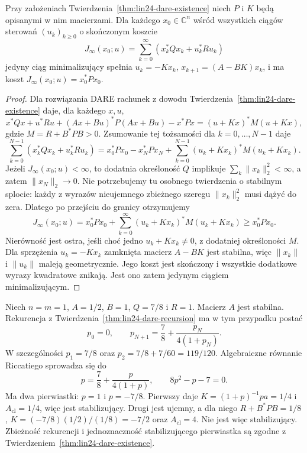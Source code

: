 \begin{wniosek}
\label{cor:lin24-discrete-opt}
Przy założeniach
Twierdzenia~\ref{thm:lin24-dare-existence}
niech \(P\) i \(K\)
będą opisanymi w nim macierzami.
Dla każdego \(x_0\in\mathbb C^n\)
wśród wszystkich ciągów sterowań
\((u_k)_{k\ge0}\)
o skończonym koszcie
\[
 J_\infty(x_0;u)
 =\sum_{k=0}^\infty
      (x_k^*Qx_k+u_k^*Ru_k)
\]
jedyny ciąg minimalizujący
spełnia \(u_k=-Kx_k\),
\(x_{k+1}=(A-BK)x_k\),
i ma koszt
\(J_\infty(x_0;u)=x_0^*Px_0\).
\end{wniosek}
\begin{proof}
Dla rozwiązania DARE
rachunek z dowodu
Twierdzenia~\ref{thm:lin24-dare-existence}
daje, dla każdego \(x,u\),
\[
 x^*Qx+u^*Ru+
 (Ax+Bu)^*P(Ax+Bu)-x^*Px
 =(u+Kx)^*M(u+Kx),
\]
gdzie \(M=R+B^*PB>0\).
Zsumowanie tej tożsamości
dla \(k=0,\ldots,N-1\)
daje
\[
 \sum_{k=0}^{N-1}
       (x_k^*Qx_k+u_k^*Ru_k)
 =x_0^*Px_0-x_N^*Px_N+
   \sum_{k=0}^{N-1}
       (u_k+Kx_k)^*M(u_k+Kx_k).
\]
Jeżeli \(J_\infty(x_0;u)<\infty\),
to dodatnia określoność \(Q\)
implikuje \(\sum_k\|x_k\|_2^2<\infty\),
a zatem \(\|x_N\|_2\to0\).
Nie potrzebujemy tu osobnego
twierdzenia o stabilnym splocie:
każdy z wyrazów nieujemnego
zbieżnego szeregu \(\|x_k\|_2^2\)
musi dążyć do zera.
Dlatego po przejściu do granicy
otrzymujemy
\[
 J_\infty(x_0;u)
 =x_0^*Px_0+
   \sum_{k=0}^\infty
       (u_k+Kx_k)^*M(u_k+Kx_k)
 \ge x_0^*Px_0.
\]
Nierówność jest ostra, jeśli
choć jedno \(u_k+Kx_k\ne0\),
z dodatniej określoności \(M\).
Dla sprzężenia \(u_k=-Kx_k\)
zamknięta macierz \(A-BK\)
jest stabilna,
więc \(\|x_k\|\) i \(\|u_k\|\)
maleją geometrycznie.
Jego koszt jest skończony
i wszystkie dodatkowe wyrazy
kwadratowe znikają.
Jest ono zatem jedynym
ciągiem minimalizującym.
\end{proof}

\begin{przyklad}
\label{prz:lin24-dare-scalar}
Niech \(n=m=1\),
\(A=1/2\), \(B=1\),
\(Q=7/8\) i \(R=1\).
Macierz \(A\) jest stabilna.
Rekurencja z
Twierdzenia~\ref{thm:lin24-dare-recursion}
ma w tym przypadku postać
\[
 p_0=0,\qquad
 p_{N+1}=\frac78+
         \frac{p_N}{4(1+p_N)}.
\]
W szczególności
\(p_1=7/8\) oraz
\(p_2=7/8+7/60=119/120\).
Algebraiczne równanie
Riccatiego sprowadza się do
\[
 p=\frac78+\frac{p}{4(1+p)},
 \qquad
 8p^2-p-7=0.
\]
Ma dwa pierwiastki:
\(p=1\) i \(p=-7/8\).
Pierwszy daje
\(K=(1+p)^{-1}pa=1/4\)
i \(A_{\mathrm{cl}}=1/4\),
więc jest stabilizujący.
Drugi jest ujemny,
a dla niego
\(R+B^*PB=1/8\),
\(K=(-7/8)(1/2)/(1/8)=-7/2\)
oraz \(A_{\mathrm{cl}}=4\).
Nie jest więc stabilizujący.
Zbieżność rekurencji i
jednoznaczność stabilizującego
pierwiastka są zgodne
z Twierdzeniem~\ref{thm:lin24-dare-existence}.
\end{przyklad}

